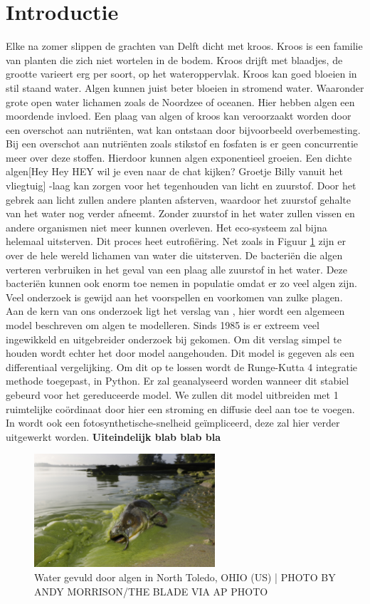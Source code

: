 \section{Introductie}
Elke na zomer slippen de grachten van Delft dicht met kroos. Kroos is een familie van planten die zich niet wortelen in de bodem. Kroos drijft met blaadjes, de grootte varieert erg per soort, op het wateroppervlak. Kroos kan goed bloeien in stil staand water. Algen kunnen juist beter bloeien in stromend water. Waaronder grote open water lichamen zoals de Noordzee of oceanen. Hier hebben algen een moordende invloed. Een plaag van algen of kroos kan veroorzaakt worden door een overschot aan nutriënten, wat kan ontstaan door bijvoorbeeld overbemesting. Bij een overschot aan nutriënten zoals stikstof en fosfaten is er geen concurrentie meer over deze stoffen. Hierdoor kunnen algen exponentieel groeien. Een dichte algen[Hey Hey HEY wil je even naar de chat kijken? Groetje Billy vanuit het vliegtuig] -laag kan zorgen voor het tegenhouden van licht en zuurstof. Door het gebrek aan licht zullen andere planten afsterven, waardoor het zuurstof gehalte van het water nog verder afneemt. Zonder zuurstof in het water zullen vissen en andere organismen niet meer kunnen overleven. Het eco-systeem zal bijna helemaal uitsterven. Dit proces heet eutrofiëring. Net zoals in Figuur \ref{fig:bloom} zijn er over de hele wereld lichamen van water die uitsterven. De bacteriën die algen verteren verbruiken in het geval van een plaag alle zuurstof in het water. Deze bacteriën kunnen ook enorm toe nemen in populatie omdat er zo veel algen zijn. Veel onderzoek is gewijd aan het voorspellen en voorkomen van zulke plagen. \\
Aan de kern van ons onderzoek ligt het verslag van \cite{Algen1985}, hier wordt een algemeen model beschreven om algen te modelleren. Sinds 1985 is er extreem veel ingewikkeld en uitgebreider onderzoek bij gekomen. Om dit verslag simpel te houden wordt echter het door \cite{Algen1985} model aangehouden. Dit model is gegeven als een differentiaal vergelijking. Om dit op te lossen wordt de Runge-Kutta 4 integratie methode toegepast, in Python. Er zal geanalyseerd worden wanneer dit stabiel gebeurd voor het gereduceerde model. We zullen dit model uitbreiden met 1 ruimtelijke coördinaat door hier een stroming en diffusie deel aan toe te voegen. In \cite{Algen1985} wordt ook een fotosynthetische-snelheid geïmpliceerd, deze zal hier verder uitgewerkt worden. \textbf{Uiteindelijk blab blab bla}
\begin{figure}[H]
    \centering
    \includegraphics[width=0.6\textwidth]{figures/Algbloom.jpg}
    \caption{Water gevuld door algen in North Toledo, OHIO (US) | PHOTO BY ANDY MORRISON/THE BLADE VIA AP PHOTO}
    \label{fig:bloom}
\end{figure}
